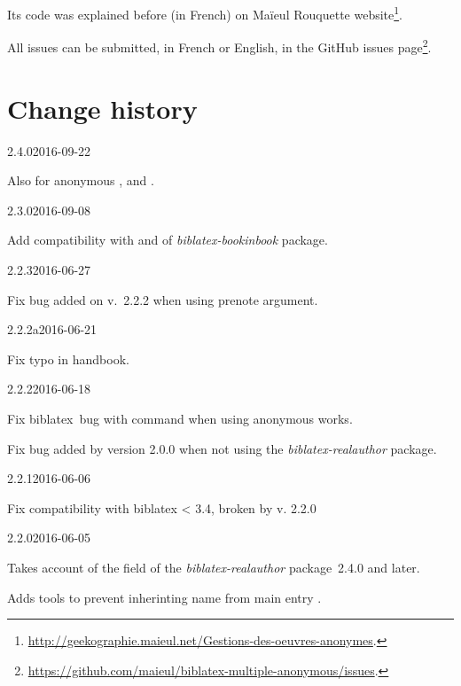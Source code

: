 \documentclass{ltxdockit}[2011/03/25]
\newcommand{\biblatex}{biblatex\xspace}
\begin{document}
Its code was explained before (in French) on Maïeul Rouquette website\footnote{\url{http://geekographie.maieul.net/Gestions-des-oeuvres-anonymes}.}.

All issues can be submitted, in French or English, in the GitHub issues page\footnote{\url{https://github.com/maieul/biblatex-multiple-anonymous/issues}.}.

\section{Change history}

\begin{changelog}

\begin{release}{2.4.0}{2016-09-22}
  \item Also for anonymous ,  and .
\end{release}

\begin{release}{2.3.0}{2016-09-08}
  \item Add compatibility with  and  of \emph{biblatex-bookinbook} package.
\end{release}

\begin{release}{2.2.3}{2016-06-27}
  \item Fix bug added on v.~2.2.2 when using prenote argument.
 \end{release}

\begin{release}{2.2.2a}{2016-06-21}
  \item Fix typo in handbook.
 \end{release}

\begin{release}{2.2.2}{2016-06-18}
  \item Fix \biblatex\ bug with  \expandafter\cs\expandafter{\prm{xx}cites} command when using anonymous works.
  \item Fix bug added by version 2.0.0 when not using the \emph{biblatex-realauthor} package.
 \end{release}
\begin{release}{2.2.1}{2016-06-06}
 \item Fix compatibility with biblatex < 3.4, broken by v. 2.2.0
\end{release}
\begin{release}{2.2.0}{2016-06-05}
  \item Takes account of the  field of the \emph{biblatex-realauthor} package~2.4.0 and later.
  \item Adds tools to prevent inherinting name from main entry .
\end{release}


\end{changelog}
\end{document}
